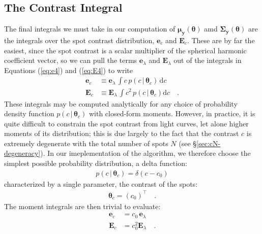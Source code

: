 \documentclass[modern]{aastex62}
\begin{document}
\subsection{The Contrast Integral}
\label{sec:contrast}
%
The final integrals we must take in our computation of
$\pmb{\mu}_{\mathbf{y}}(\pmb{\theta})$
amd $\pmb{\Sigma}_{\mathbf{y}}(\pmb{\theta})$ are the integrals over
the spot contrast distribution, $\mathbf{e}_c$ and $\mathbf{E}_c$.
These are by far the easiest, since the spot contrast is a scalar
multiplier of the spherical harmonic coefficient vector, so we can
pull the terms $\mathbf{e}_\lambda$ and $\mathbf{E}_\lambda$ out
of the
integrals in Equations (\ref{eq:e4}) and (\ref{eq:E4}) to write
%
\begin{align}
    \mathbf{e}_c
     & \equiv
    \mathbf{e}_\lambda \,
    \int
    c \,
    p(c \, \big| \, \pmb{\theta}_{c}) \,
    \mathrm{d}c
    \\
    \mathbf{E}_c
     & \equiv
    \mathbf{E}_\lambda \,
    \int
    c^2 \,
    p(c \, \big| \, \pmb{\theta}_c)
    \mathrm{d}c
    \quad.
\end{align}
%
These integrals may be computed analytically for any choice of
probability density function $p(c \, \big| \, \pmb{\theta}_c)$
with closed-form moments.
%
However, in practice, it is quite difficult to constrain the
spot contrast from light curves, let alone higher moments of its
distribution; this is due largely to the fact that the contrast $c$
is extremely degenerate with the total number of spots $N$
(see \S\ref{sec:cN-degeneracy}).
%
In our imeplementation of the algorithm,
we therefore choose the simplest possible probability distribution,
a delta function:
%
\begin{align}
    p(c \, \big| \, \pmb{\theta}_{c}) = \delta(c - c_0)
\end{align}
%
characterized by a single parameter, the contrast of the spots:
%
\begin{align}
    \pmb{\theta}_c = \left( c_0 \right)^\top
    \quad.
\end{align}
%
The moment integrals are then trivial to evaluate:
%
\begin{align}
    \mathbf{e}_c & = c_0 \, \mathbf{e}_\lambda
    \\
    \mathbf{E}_c & = c_0^2 \mathbf{E}_\lambda
    \quad.
\end{align}
%
\end{document}
